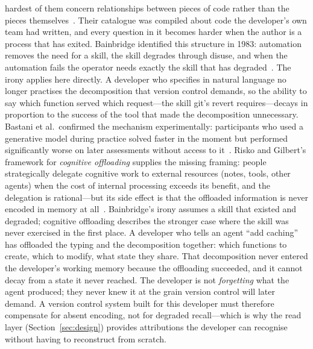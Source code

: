 hardest of them concern relationships between pieces of code rather than the
pieces themselves~\cite{sillito2008}. Their catalogue was compiled about code
the developer's own team had written, and every question in it becomes harder
when the author is a process that has exited. Bainbridge identified this
structure in 1983: automation removes the need for a skill, the skill degrades
through disuse, and when the automation fails the operator needs exactly the
skill that has degraded~\cite{bainbridge1983}. The irony applies here directly.
A developer who specifies in natural language no longer practises the
decomposition that version control demands, so the ability to say which function
served which request---the skill git's revert requires---decays in proportion to
the success of the tool that made the decomposition unnecessary. Bastani et al.\ confirmed the mechanism experimentally: participants who used a
generative model during practice solved faster in the moment but performed
significantly worse on later assessments without access to
it~\cite{bastani2025}. Risko and Gilbert's framework for \emph{cognitive
offloading} supplies the missing framing: people strategically delegate
cognitive work to external resources (notes, tools, other agents) when the
cost of internal processing exceeds its benefit, and the delegation is
rational---but its side effect is that the offloaded information is never
encoded in memory at all~\cite{risko2016}. Bainbridge's irony assumes a skill
that existed and degraded; cognitive offloading describes the stronger case
where the skill was never exercised in the first place. A developer who tells
an agent ``add caching'' has offloaded the typing and the
decomposition together: which functions to create, which to modify, what state
they share. That decomposition never entered the developer's working memory because
the offloading succeeded, and it cannot decay from a state it never reached.
The developer is not \emph{forgetting} what the agent produced; they never knew
it at the grain version control will later demand. A version control system
built for this developer must therefore compensate for absent encoding, not for
degraded recall---which is why the read layer (Section~\ref{sec:design})
provides attributions the developer can recognise without having to reconstruct
from scratch.

